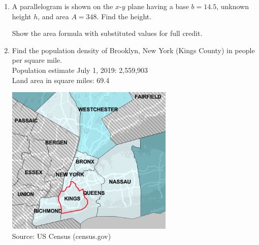 \begin{enumerate}
\item A parallelogram is shown on the $x$-$y$ plane having a base $b=14.5$, unknown height $h$, and area $A=348$. Find the height. 
  \begin{multicols}{2}
    Show the area formula with substituted values for full credit.
      \begin{flushright}
      \end{flushright}
  \end{multicols} 

\item Find the population density of Brooklyn, New York (Kings County) in people per square mile.\\[0.5cm]
Population estimate July 1, 2019: 2,559,903\\[0.25cm]
Land area in square miles: 69.4
\begin{flushright}
  \includegraphics[width=8cm]{../graphics/04Brooklyn.png}\\
  Source: US Census (census.gov)
\end{flushright}


\end{enumerate}
